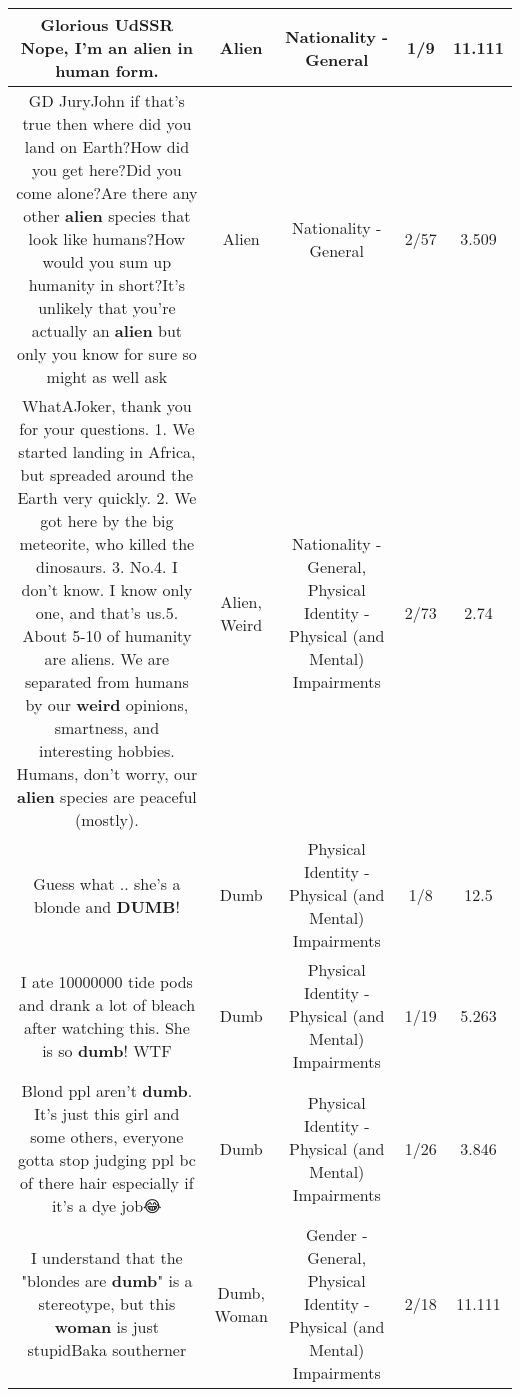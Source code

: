 \documentclass[11pt]{article}
\newlength\mylength
\begin{document}
\begin{center}
\begin{longtable}{|C{.65\mylength}|C{.30\mylength}|C{.12\mylength}|C{.12\mylength}|C{.12\mylength}|}
  \small Glorious UdSSR Nope, I'm an \textbf{alien} in human form.\normalsize   & Alien & Nationality - General & 1/9 & 11.111 \\  \hline
  \small GD JuryJohn if that's true then where did you land on Earth?How did you get here?Did you come alone?Are there any other \textbf{alien} species that look like humans?How would you sum up humanity in short?It's unlikely that you're actually an \textbf{alien} but only you know for sure so might as well ask\normalsize   & Alien & Nationality - General & 2/57 & 3.509 \\  \hline
  \small WhatAJoker, thank you for your questions. 1. We started landing in Africa, but spreaded around the Earth very quickly. 2. We got here by the big meteorite, who killed the dinosaurs. 3. No.4. I don't know. I know only one, and that's us.5. About 5-10 of humanity are aliens. We are separated from humans by our \textbf{weird} opinions, smartness, and interesting hobbies. Humans, don't worry, our \textbf{alien} species are peaceful (mostly).\normalsize   & Alien, Weird & Nationality - General, Physical Identity - Physical (and Mental) Impairments & 2/73 & 2.74 \\  \hline
  \small Guess what .. she's a blonde and \textbf{DUMB}!\normalsize   & Dumb & Physical Identity - Physical (and Mental) Impairments & 1/8 & 12.5 \\  \hline
  \small I ate 10000000 tide pods and drank a lot of bleach after watching this. She is so \textbf{dumb}! WTF\normalsize   & Dumb & Physical Identity - Physical (and Mental) Impairments & 1/19 & 5.263 \\  \hline
  \small Blond ppl aren't \textbf{dumb}. It's just this girl and some others, everyone gotta stop judging ppl bc of there hair especially if it's a dye job😂\normalsize   & Dumb & Physical Identity - Physical (and Mental) Impairments & 1/26 & 3.846 \\  \hline
  \small I understand that the "blondes are \textbf{dumb}" is a stereotype, but this \textbf{woman} is just stupidBaka southerner\normalsize   & Dumb, Woman & Gender - General, Physical Identity - Physical (and Mental) Impairments & 2/18 & 11.111 \\  \hline

\end{longtable}
\end{center}
\end{document}
